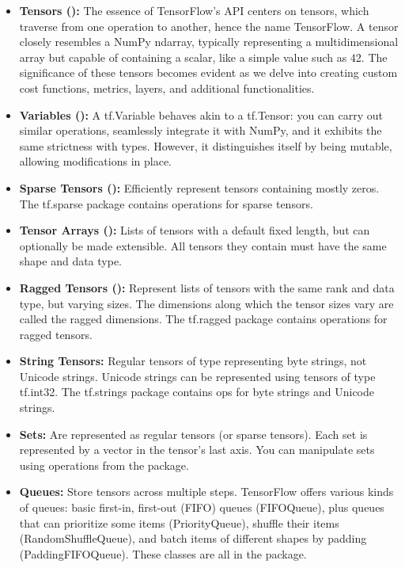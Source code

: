 \begin{itemize}
	\item \textbf{Tensors ():} The essence of TensorFlow's API centers on tensors, which traverse from one operation to another, hence the name TensorFlow. A tensor closely resembles a NumPy ndarray, typically representing a multidimensional array but capable of containing a scalar, like a simple value such as 42. The significance of these tensors becomes evident as we delve into creating custom cost functions, metrics, layers, and additional functionalities.
	
	\item \textbf{Variables ():} A tf.Variable behaves akin to a tf.Tensor: you can carry out similar operations, seamlessly integrate it with NumPy, and it exhibits the same strictness with types. However, it distinguishes itself by being mutable, allowing modifications in place.
	
 	\item \textbf{Sparse Tensors ():}
	Efficiently represent tensors containing mostly zeros. The tf.sparse package contains operations for sparse tensors.
	
	\item \textbf{Tensor Arrays ():}
	Lists of tensors with a default fixed length, but can optionally be made extensible. All tensors they contain must have the same shape and data type.
	
	\item \textbf{Ragged Tensors ():}
	Represent lists of tensors with the same rank and data type, but varying sizes. The dimensions along which the tensor sizes vary are called the ragged dimensions. The tf.ragged package contains operations for ragged tensors.
	
	\item \textbf{String Tensors:}
	Regular tensors of type  representing byte strings, not Unicode strings. Unicode strings can be represented using tensors of type tf.int32. The tf.strings package contains ops for byte strings and Unicode strings.
	
	\item \textbf{Sets:}
	Are represented as regular tensors (or sparse tensors). Each set is represented by a vector in the tensor’s last axis. You can manipulate sets using operations from the  package.
	
	\item \textbf{Queues:}
	Store tensors across multiple steps. TensorFlow offers various kinds of queues: basic first-in, first-out (FIFO) queues (FIFOQueue), plus queues that can prioritize some items (PriorityQueue), shuffle their items (RandomShuffleQueue), and batch items of different shapes by padding (PaddingFIFOQueue). These classes are all in the  package.
	
\end{itemize}

